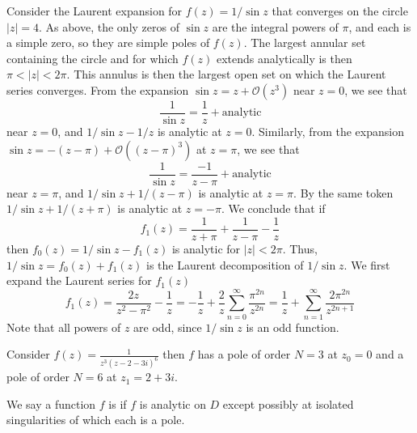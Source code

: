 \begin{example}
    Consider the Laurent expansion for $f(z) = 1/\sin z$ that converges on the circle $|z| = 4$. As above, the only zeros of $\sin z$ are the integral powers of $\pi$, and each is a simple zero, so they are simple poles of $f(z)$. The largest annular set containing the circle and for which $f(z)$ extends analytically is then $\pi < |z| < 2\pi$. This annulus is then the largest open set on which the Laurent series converges. From the expansion $\sin z = z+\mathcal{O}(z^3)$ near $z = 0$, we see that \begin{equation*}
        \frac{1}{\sin z} = \frac{1}{z} + \text{analytic}
    \end{equation*}
    near $z = 0$, and $1/\sin z - 1/z$ is analytic at $z = 0$. Similarly, from the expansion $\sin z = -(z-\pi)+\mathcal{O}((z-\pi)^3)$ at $z = \pi$, we see that \begin{equation*}
        \frac{1}{\sin z} = \frac{-1}{z-\pi} + \text{analytic}
    \end{equation*}
    near $z = \pi$, and $1/\sin z + 1/(z-\pi)$ is analytic at $z = \pi$. By the same token $1/\sin z + 1/(z+\pi)$ is analytic at $z = -\pi$. We conclude that if \begin{equation*}
        f_1(z) = \frac{1}{z+\pi}+\frac{1}{z-\pi}-\frac{1}{z}
    \end{equation*}
    then $f_0(z) = 1/\sin z-f_1(z)$ is analytic for $|z| < 2\pi$. Thus, $1/\sin z = f_0(z) + f_1(z)$ is the Laurent decomposition of $1/\sin z$. We first expand the Laurent series for $f_1(z)$ \begin{equation*}
        f_1(z) = \frac{2z}{z^2-\pi^2}-\frac{1}{z} = -\frac{1}{z} + \frac{2}{z}\sum_{n=0}^{\infty}\frac{\pi^{2n}}{z^{2n}} = \frac{1}{z} + \sum_{n=1}^{\infty}\frac{2\pi^{2n}}{z^{2n+1}}
    \end{equation*}
    Note that all powers of $z$ are odd, since $1/\sin z$ is an odd function.
\end{example}

\begin{example}
    Consider $f(z) = \frac{1}{z^3(z-2-3i)^6}$ then $f$ has a pole of order $N = 3$ at $z_0 = 0$ and a pole of order $N = 6$ at $z_1 = 2 + 3i$.
\end{example}

\begin{definition}
    We say a function $f$ is  if $f$ is analytic on $D$ except possibly at isolated singularities of which each is a pole.
\end{definition}

